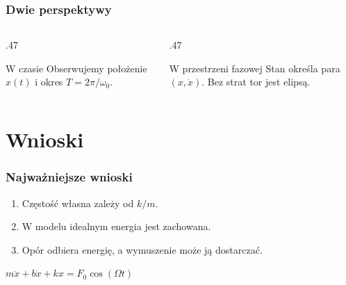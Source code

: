 \documentclass[aspectratio=169]{beamer}
\begin{document}
\begin{frame}
  \frametitle{Dwie perspektywy}
  \begin{columns}[T]
    \begin{column}{.47\textwidth}
      \begin{block}{W czasie}
        Obserwujemy położenie $x(t)$ i okres
        $T=2\pi/\omega_0$.
      \end{block}
    \end{column}
    \begin{column}{.47\textwidth}
      \begin{exampleblock}{W przestrzeni fazowej}
        Stan określa para $(x,\dot x)$.
        Bez strat tor jest elipsą.
      \end{exampleblock}
    \end{column}
  \end{columns}
\end{frame}

\section{Wnioski}
\begin{frame}
  \frametitle{Najważniejsze wnioski}
  \begin{enumerate}
    \item Częstość własna zależy od $k/m$.
    \item W modelu idealnym energia jest zachowana.
    \item Opór odbiera energię, a wymuszenie może ją dostarczać.
  \end{enumerate}
  \medskip
  \centering\large $m\ddot x+b\dot x+kx=F_0\cos(\Omega t)$
\end{frame}
\end{document}
